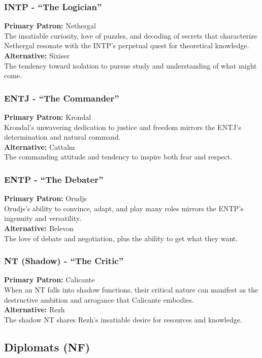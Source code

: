 \documentclass[a4paper,twoside,openany]{book}
\begin{document}
\begin{multicols}{2}
	\subsubsection*{INTP - ``The Logician''}
	\textbf{Primary Patron:} Nethergal\\
	The insatiable curiosity, love of puzzles, and decoding of secrets that characterize Nethergal resonate with the INTP's perpetual quest for theoretical knowledge.\\
	\textbf{Alternative:} Sixiser\\
	The tendency toward isolation to pursue study and understanding of what might come.

	\subsubsection*{ENTJ - ``The Commander''}
	\textbf{Primary Patron:} Krondal\\
	Krondal's unwavering dedication to justice and freedom mirrors the ENTJ's determination and natural command.\\
	\textbf{Alternative:} Cattalm\\
	The commanding attitude and tendency to inspire both fear and respect.

	\subsubsection*{ENTP - ``The Debater''}
	\textbf{Primary Patron:} Orudjs\\
	Orudjs's ability to convince, adapt, and play many roles mirrors the ENTP's ingenuity and versatility.\\
	\textbf{Alternative:} Belevon\\
	The love of debate and negotiation, plus the ability to get what they want.

	\subsubsection*{NT (Shadow) - ``The Critic''}
	\textbf{Primary Patron:} Calicante\\
	When an NT falls into shadow functions, their critical nature can manifest as the destructive ambition and arrogance that Calicante embodies.\\
	\textbf{Alternative:} Rezh\\
	The shadow NT shares Rezh's insatiable desire for resources and knowledge.

	\subsection{Diplomats (NF)}

\end{multicols}
\end{document}
